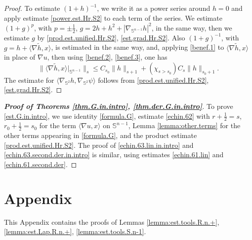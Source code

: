 \documentclass[10pt,reqno,a4paper]{article}
\numberwithin{equation}{section}
\theoremstyle{plain}
\theoremstyle{definition}
\renewcommand{\S}{{\mathbb S}}
\newcommand{\la}{\langle}
\newcommand{\ra}{\rangle}
\newcommand{\grad}{\nabla}
\begin{document}
\begin{proof}
To estimate $(1+h)^{-1}$, we write it as a power series around $h=0$ 
and apply estimate \eqref{power.est.Hr.S2} to each term of the series. 
We estimate $(1+g)^p$, with $p = \pm \frac12$, 
$g = 2h + h^2 + |\grad_{\S^{n-1}} h|^2$, 
in the same way, then we estimate $g$ by \eqref{prod.est.unified.Hr.S2}, \eqref{est.grad.Hr.S2}.
Also $(1+g)^{-1}$, with $g = h + \la \grad \tilde h, x \ra$, 
is estimated in the same way, and,  
applying \eqref{benef.1} to $\la \grad \tilde h, x \ra$ in place of $\grad u$, 
then using \eqref{benef.2}, \eqref{benef.3}, 
one has 
\[
\| \la \grad \tilde h , x \ra|_{\S^{n-1}} \|_{s} 
\leq C_{s_0} \| h \|_{s+1} + (\chi_{s>s_0}) C_s \| h \|_{s_0+1}.
\]
The estimate for $\la \grad_{\S^2} h, \grad_{\S^2} \psi \ra$ follows from 
\eqref{prod.est.unified.Hr.S2}, \eqref{est.grad.Hr.S2}.
\end{proof}



\begin{proof}[\textbf{Proof of Theorems \ref{thm.G.in.intro}, \ref{thm.der.G.in.intro}}]
To prove \eqref{est.G.in.intro}, 
we use identity \eqref{formula.G},
estimate \eqref{echin.62} 
with $r + \frac12 = s$, $r_0 + \frac12 = s_0$ 
for the term $\la \grad u , x \ra$ on $\S^{n-1}$, 
Lemma \ref{lemma:other.terms} for the other terms appearing in \eqref{formula.G}, 
and the product estimate \eqref{prod.est.unified.Hr.S2}. 
The proof of \eqref{echin.63.lin.in.intro} and \eqref{echin.63.second.der.in.intro} 
is similar, using estimates \eqref{echin.61.lin} and \eqref{echin.61.second.der}.  
\end{proof}





\section{Appendix} 
\label{sec:appendix}

This Appendix contains the proofs of Lemmas \ref{lemma:est.tools.R.n.+}, 
\ref{lemma:est.Lap.R.n.+},
\ref{lemma:est.tools.S.n-1}. 
\end{document}
